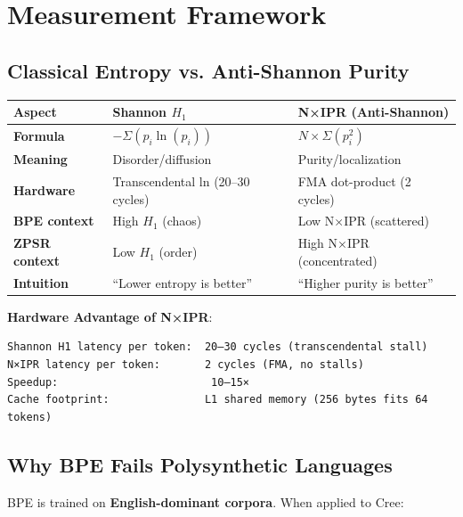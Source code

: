 \documentclass[11pt,oneside]{article}
\begin{document}
\section{Measurement Framework}

\subsection{Classical Entropy vs. Anti-Shannon Purity}

\begin{center}
\begin{tabular}{lll}
\toprule
Aspect & Shannon $H_1$ & N×IPR (Anti-Shannon) \\
\midrule
\textbf{Formula} & $-\Sigma(p_i \ln(p_i))$ & $N \times \Sigma(p_i^2)$ \\
\textbf{Meaning} & Disorder/diffusion & Purity/localization \\
\textbf{Hardware} & Transcendental ln (20--30 cycles) & FMA dot-product (2 cycles) \\
\textbf{BPE context} & High $H_1$ (chaos) & Low N×IPR (scattered) \\
\textbf{ZPSR context} & Low $H_1$ (order) & High N×IPR (concentrated) \\
\textbf{Intuition} & ``Lower entropy is better'' & ``Higher purity is better'' \\
\bottomrule
\end{tabular}
\end{center}

\textbf{Hardware Advantage of N×IPR}:
\begin{lstlisting}
Shannon H1 latency per token:  20–30 cycles (transcendental stall)
N×IPR latency per token:       2 cycles (FMA, no stalls)
Speedup:                        10–15×
Cache footprint:               L1 shared memory (256 bytes fits 64 tokens)
\end{lstlisting}

\subsection{Why BPE Fails Polysynthetic Languages}

BPE is trained on \textbf{English-dominant corpora}. When applied to Cree:
\end{document}
